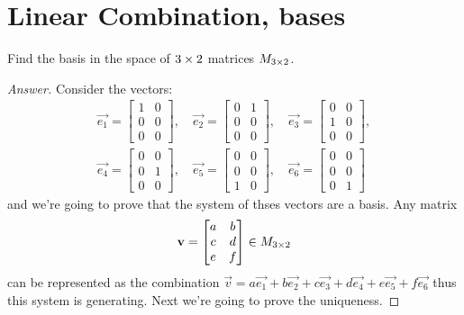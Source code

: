 \section{Linear Combination, bases}
\begin{exercise}
  Find the basis in the space of $3\times 2$ matrices
  $M_{3\times 2}$.
\end{exercise}
\begin{proof}[Answer]
  Consider the vectors:
  \begin{align*}
    \vec{e_1}=\begin{bmatrix} 1&0\\0&0\\0&0 \end{bmatrix},\quad
    \vec{e_2}=\begin{bmatrix} 0&1\\0&0\\0&0 \end{bmatrix},\quad
    \vec{e_3}=\begin{bmatrix} 0&0\\1&0\\0&0 \end{bmatrix},\\[0.3cm]
    \vec{e_4}=\begin{bmatrix} 0&0\\0&1\\0&0 \end{bmatrix},\quad
    \vec{e_5}=\begin{bmatrix} 0&0\\0&0\\1&0 \end{bmatrix},\quad
    \vec{e_6}=\begin{bmatrix} 0&0\\0&0\\0&1 \end{bmatrix}
  \end{align*}
  and we're going to prove that the system of thses vectors are a basis.
  Any  matrix 
  \[
    \mathbf{v}=
    \begin{bmatrix}
      a&b\\ c&d\\ e&f
    \end{bmatrix}\in M_{3\times 2}
  \]
  can be represented as the combination
  $\vec{v}=a\vec{e_1}+b\vec{e_2}+c\vec{e_3}+d\vec{e_4}+e\vec{e_5}+f\vec{e_6}$
  thus this system is generating. Next we're going to prove the uniqueness.


\end{proof}
